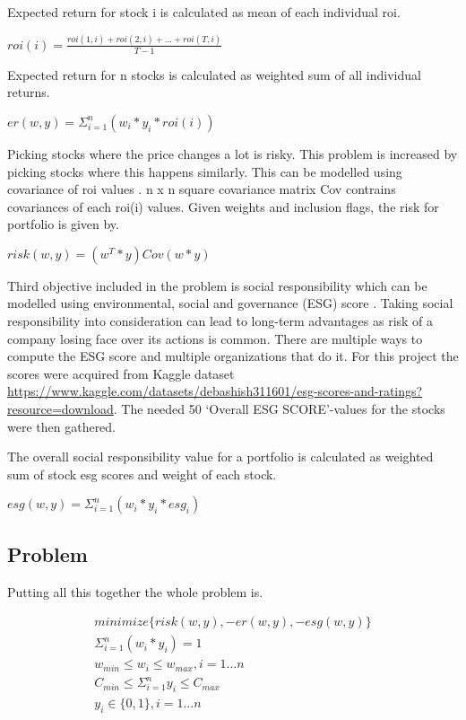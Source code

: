 \documentclass[11pt]{article} %
\begin{document}
Expected return for stock i is calculated as mean of each individual roi.

$roi(i) = \frac{roi(1, i) + roi(2, i) + ... + roi(T, i)}{T-1}$

Expected return for n stocks is calculated as weighted sum of all individual returns.

$er(w,y) = \Sigma_{i=1}^{n} (w_i * y_i * roi(i))$

Picking stocks where the price changes a lot is risky. This problem is increased by picking stocks where this happens similarly. This can be modelled using covariance of roi values \cite{kolm201460}. n x n square covariance matrix Cov contrains covariances of each roi(i) values. Given weights and inclusion flags, the risk for portfolio is given by.

$risk(w,y) = (w^T * y) Cov (w * y)$

Third objective included in the problem is social responsibility which can be modelled using environmental, social and governance (ESG) score \cite{chen2021social}. Taking social responsibility into consideration can lead to long-term advantages as risk of a company losing face over its actions is common. There are multiple ways to compute the ESG score and multiple organizations that do it. For this project the scores were acquired from Kaggle dataset \url{https://www.kaggle.com/datasets/debashish311601/esg-scores-and-ratings?resource=download}. The needed 50 `Overall ESG SCORE'-values for the stocks were then gathered. 

The overall social responsibility value for a portfolio is calculated as weighted sum of stock esg scores and weight of each stock.

$esg(w,y) = \Sigma_{i=1}^n (w_i * y_i * esg_i)$



\subsection{Problem}

Putting all this together the whole problem is.

\begin{equation}
\begin{split}
minimize \{ risk(w,y), -er(w,y), -esg(w,y) \}\\
\Sigma_{i=1}^n (w_i * y_i) = 1\\
w_{min} \leq w_i \leq w_{max}, i = 1...n\\
C_{min} \leq \Sigma_{i=1}^n y_i \leq C_{max}\\
y_i \in \{0,1\}, i = 1...n\
\end{split}
\end{equation}
\end{document}
